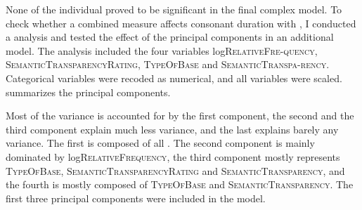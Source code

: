 None of the individual  proved to be significant in the final complex model. To check whether a combined  measure affects consonant duration with , I conducted a  analysis and tested the effect of the principal components in an additional model. The  analysis included the four variables log\textsc{RelativeFre-quency}, \textsc{SemanticTransparencyRating}, \textsc{TypeOfBase} and \textsc{SemanticTranspa-rency}. Categorical variables were recoded as numerical, and all variables were scaled.  summarizes the principal components.



\begin{table}
	\caption{ Summary of principal components}
	\label{tbl: summary PC dis exp}
	
	
\end{table}


Most of the variance is accounted for by the first component, the second and the third component explain much less variance, and the last  explains barely any variance. 
The first  is composed of all . The second component is mainly dominated by log\textsc{RelativeFrequency}, the third component mostly represents \textsc{TypeOfBase}, \textsc{SemanticTransparencyRating} and \textsc{SemanticTransparency}, and the fourth is mostly composed of \textsc{TypeOfBase} and \textsc{SemanticTransparency}. The first three principal components were included in the model.


